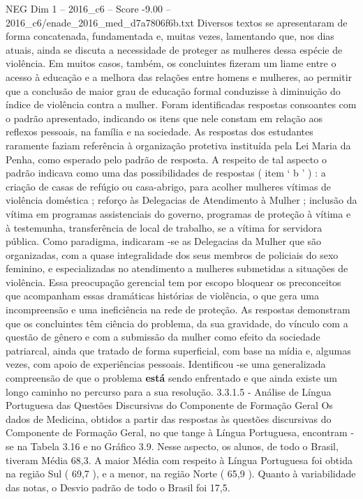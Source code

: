 \begin{textsample}{NEG Dim 1 – 2016\_c6 – Score -9.00 – 2016\_c6/enade\_2016\_med\_d7a7806f6b.txt}
Diversos textos se apresentaram de forma concatenada, fundamentada e, muitas vezes, lamentando que, nos dias atuais, ainda se discuta a necessidade de proteger as mulheres dessa espécie de violência.
Em muitos casos, também, os concluintes fizeram um liame entre o acesso à educação e a melhora das relações entre homens e mulheres, ao permitir que a conclusão de maior grau de educação formal conduzisse à diminuição do índice de violência contra a mulher.
Foram identificadas respostas consoantes com o padrão apresentado, indicando os itens que nele constam em relação aos reflexos pessoais, na família e na sociedade.
As respostas dos estudantes raramente faziam referência à organização protetiva instituída pela Lei Maria da Penha, como esperado pelo padrão de resposta.
A respeito de tal aspecto o padrão indicava como uma das possibilidades de respostas ( item ‘ b ’ ) : a criação de casas de refúgio ou casa-abrigo, para acolher mulheres vítimas de violência doméstica ; reforço às Delegacias de Atendimento à Mulher ; inclusão da vítima em programas assistenciais do governo, programas de proteção à vítima e à testemunha, transferência de local de trabalho, se a vítima for servidora pública.
Como paradigma, indicaram -se as Delegacias da Mulher que são organizadas, com a quase integralidade dos seus membros de policiais do sexo feminino, e especializadas no atendimento a mulheres submetidas a situações de violência.
Essa preocupação gerencial tem por escopo bloquear os preconceitos que acompanham essas dramáticas histórias de violência, o que gera uma incompreensão e uma ineficiência na rede de proteção.
As respostas demonstram que os concluintes têm ciência do problema, da sua gravidade, do vínculo com a questão de gênero e com a submissão da mulher como efeito da sociedade patriarcal, ainda que tratado de forma superficial, com base na mídia e, algumas vezes, com apoio de experiências pessoais.
Identificou -se uma generalizada compreensão de que o problema \textbf{está} sendo enfrentado e que ainda existe um longo caminho no percurso para a sua resolução. 3.3.1.5 - Análise de Língua Portuguesa das Questões Discursivas do Componente de Formação Geral Os dados de Medicina, obtidos a partir das respostas às questões discursivas do Componente de Formação Geral, no que tange à Língua Portuguesa, encontram -se na Tabela 3.16 e no Gráfico 3.9.
Nesse aspecto, os alunos, de todo o Brasil, tiveram Média 68,3.
A maior Média com respeito à Língua Portuguesa foi obtida na região Sul ( 69,7 ), e a menor, na região Norte ( 65,9 ).
Quanto à variabilidade das notas, o Desvio padrão de todo o Brasil foi 17,5.

\end{textsample}
